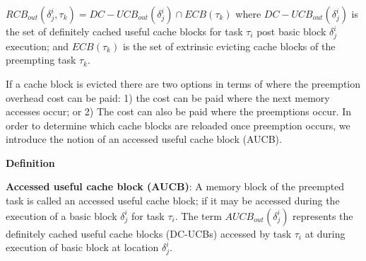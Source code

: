 \begin{math}RCB_{out}(\delta_{j}^{i},\tau_{k}) = DC-UCB_{out}(\delta_{j}^{i}) \cap ECB(\tau_{k}) \end{math} where \begin{math}DC-UCB_{out}(\delta_{j}^{i})\end{math} is the set of definitely cached useful cache blocks for task \begin{math}\tau_{i}\end{math} post basic block \begin{math}\delta_{j}^{i}\end{math} execution; and \begin{math}ECB(\tau_{k})\end{math} is the set of extrinsic evicting cache blocks of the preempting task \begin{math}\tau_{k}\end{math}.

If a cache block is evicted there are two options in terms of where the preemption overhead cost can be paid: 1) the cost can be paid where the next memory accesses occur; or 2) The cost can also be paid where the preemptions occur.  In order to determine which cache blocks are reloaded once preemption occurs, we introduce the notion of an accessed useful cache block (AUCB).

\textbf{Definition}

\textbf{Accessed useful cache block (AUCB)}: A memory block of the preempted task is called an accessed useful cache block; if it may be accessed during the execution of a basic block \begin{math}\delta_{j}^{i}\end{math} for task \begin{math}\tau_{i}\end{math}.  The term \begin{math}AUCB_{out}(\delta_{j}^{i})\end{math} represents the definitely cached useful cache blocks (DC-UCBs) accessed by task \begin{math}\tau_{i}\end{math} at during execution of basic block at location \begin{math}\delta_{j}^{i}\end{math}.

